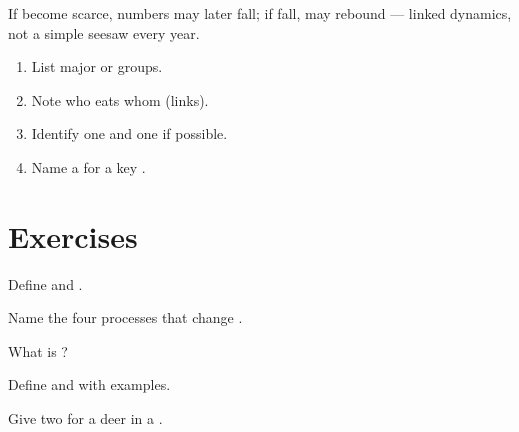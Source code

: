 \begin{example}\label{ex:g8:populations:pred}
If  become scarce,  numbers may later fall; if  fall,
 may rebound --- linked dynamics, not a simple seesaw every year.
\end{example}

\begin{method}\label{met:g8:populations:describe}
\begin{enumerate}
  \item List major  or groups.
  \item Note who eats whom (links).
  \item Identify one  and one  if possible.
  \item Name a  for a key .
\end{enumerate}
\end{method}

\section{Exercises}

\begin{exercise}[$\star$]\label{exo:g8:populations:1}
Define  and .
\end{exercise}

\begin{exercise}[$\star$]\label{exo:g8:populations:2}
Name the four processes that change .
\end{exercise}

\begin{exercise}[$\star$]\label{exo:g8:populations:3}
What is ?
\end{exercise}

\begin{exercise}[$\star$]\label{exo:g8:populations:4}
Define  and  with examples.
\end{exercise}

\begin{exercise}[$\star$]\label{exo:g8:populations:5}
Give two  for a deer  in a .
\end{exercise}

